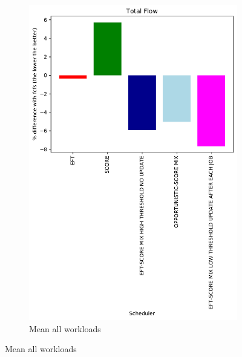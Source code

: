 \documentclass[a4paper]{article}
\begin{document}
\begin{figure}[H]\centering
\begin{subfigure}[b]{0.4\linewidth}\centering\includegraphics[width=1\linewidth]{MBSS/plot/Results_Percentage_FCFS_All_workloads_mean_Total_Flow_450_128_32_256_4_1024.pdf}\caption{Mean all workloads}\end{subfigure}

\end{figure}
\end{document}
